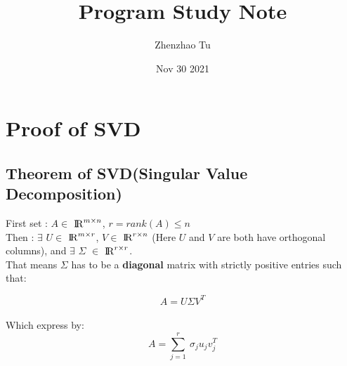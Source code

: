 \documentclass{article}
\title{Program Study Note}
\author{Zhenzhao Tu}
\date{Nov 30 2021}
\begin{document}
\maketitle

\section{Proof of SVD}

\subsection{Theorem of SVD(Singular Value Decomposition)}
First set :
$A \in$
${\rm I\!R}^{m \times n}$,
$r = rank(A) \leq n$
\\
Then : 
$\exists$
$U \in $
${\rm I\!R}^{m \times r}$,
$V \in$
${\rm I\!R}^{r \times n}$
(Here $U$ and $V$ are both have orthogonal columns), and
$\exists$
$\Sigma$
$\in$
${\rm I\!R}^{r \times r}$.
\\
That means
$\Sigma$
has to be a \textbf{diagonal} matrix with strictly positive entries such that:

\begin{equation}
	A = U \Sigma V^T
\end{equation}
\\
Which express by:
\begin{equation}
	A = \sum_{j=1}^{r} \ \sigma_j u_j v_j^T
\end{equation}
\end{document}
